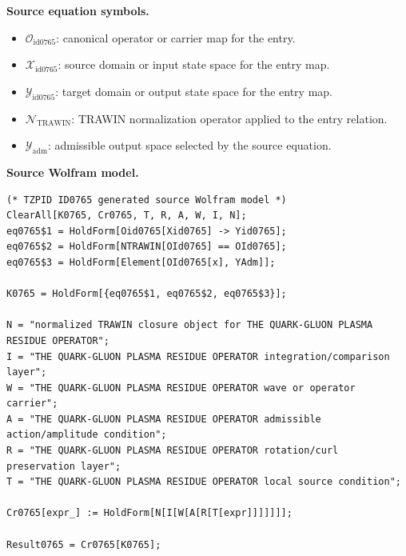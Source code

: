 \begin{minipage}[t]{0.49\linewidth}
\begingroup
\small
\raggedright
\textbf{Source equation symbols.}\par
\begin{itemize}[leftmargin=1.35em,itemsep=1pt,topsep=1pt,parsep=0pt]
    \item $\mathcal{O}_{\mathrm{id0765}}$: canonical operator or carrier map for the entry.
    \item $\mathcal{X}_{\mathrm{id0765}}$: source domain or input state space for the entry map.
    \item $\mathcal{Y}_{\mathrm{id0765}}$: target domain or output state space for the entry map.
    \item $\mathcal{N}_{\mathrm{TRAWIN}}$: TRAWIN normalization operator applied to the entry relation.
    \item $\mathcal{Y}_{\mathrm{adm}}$: admissible output space selected by the source equation.
\end{itemize}
\endgroup
\end{minipage}\hfill
\begin{minipage}[t]{0.47\linewidth}
\begingroup
\scriptsize
\raggedright
\textbf{Source Wolfram model.}\par
\begin{Verbatim}[fontsize=\tiny,breaklines=true,breakanywhere=true]
(* TZPID ID0765 generated source Wolfram model *)
ClearAll[K0765, Cr0765, T, R, A, W, I, N];
eq0765$1 = HoldForm[Oid0765[Xid0765] -> Yid0765];
eq0765$2 = HoldForm[NTRAWIN[OId0765] == OId0765];
eq0765$3 = HoldForm[Element[OId0765[x], YAdm]];

K0765 = HoldForm[{eq0765$1, eq0765$2, eq0765$3}];

N = "normalized TRAWIN closure object for THE QUARK-GLUON PLASMA RESIDUE OPERATOR";
I = "THE QUARK-GLUON PLASMA RESIDUE OPERATOR integration/comparison layer";
W = "THE QUARK-GLUON PLASMA RESIDUE OPERATOR wave or operator carrier";
A = "THE QUARK-GLUON PLASMA RESIDUE OPERATOR admissible action/amplitude condition";
R = "THE QUARK-GLUON PLASMA RESIDUE OPERATOR rotation/curl preservation layer";
T = "THE QUARK-GLUON PLASMA RESIDUE OPERATOR local source condition";

Cr0765[expr_] := HoldForm[N[I[W[A[R[T[expr]]]]]]];

Result0765 = Cr0765[K0765];
\end{Verbatim}
\endgroup
\end{minipage}

